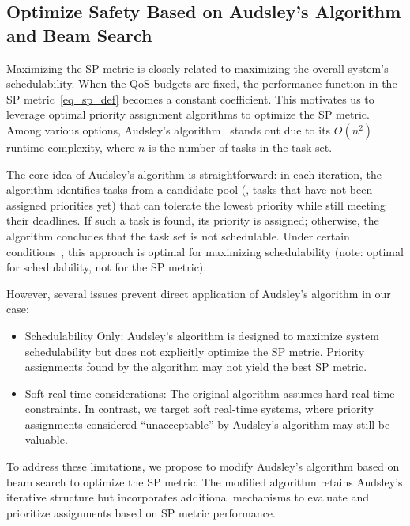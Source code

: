 	\subsection{Optimize Safety Based on Audsley's Algorithm and Beam Search}
	\label{section_audsley_pa}
    Maximizing the SP metric is closely related to maximizing the overall system's schedulability.
    When the QoS budgets are fixed, the performance function in the SP metric~\eqref{eq_sp_def} becomes a constant coefficient.
    This motivates us to leverage optimal priority assignment algorithms to optimize the SP metric.
    Among various options, Audsley's algorithm~\cite{Audsley91optimalpriority} stands out due to its $O(n^2)$ runtime complexity, where $n$ is the number of tasks in the task set.

    The core idea of Audsley's algorithm is straightforward: in each iteration, the algorithm identifies tasks from a candidate pool (\ie, tasks that have not been assigned priorities yet) that can tolerate the lowest priority while still meeting their deadlines.
    If such a task is found, its priority is assigned; otherwise, the algorithm concludes that the task set is not schedulable.
    Under certain conditions~\cite{Audsley91optimalpriority}, this approach is optimal for maximizing schedulability (note: optimal for schedulability, not for the SP metric).


    	However, several issues prevent direct application of Audsley's algorithm in our case:
    \begin{itemize}
        \item Schedulability Only: Audsley's algorithm is designed to maximize system schedulability but does not explicitly optimize the SP metric.
        Priority assignments found by the algorithm may not yield the best SP metric.
        \item Soft real-time considerations: The original algorithm assumes hard real-time constraints.
        In contrast, we target soft real-time systems, where priority assignments considered ``unacceptable'' by Audsley's algorithm may still be valuable.
    \end{itemize}

    To address these limitations, we propose to modify Audsley's algorithm based on beam search to optimize the SP metric.
    The modified algorithm retains Audsley's iterative structure but incorporates additional mechanisms to evaluate and prioritize assignments based on SP metric performance.

